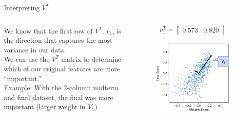 \documentclass[aspectratio=169]{../latex_main/tntbeamer}  %
\begin{document}
	
	\begin{frame}{Interpreting $V^T$}
	 \begin{columns}
	     \begin{column}{.5\textwidth}
	         We know that the first row of $V^T$, $v_1$, is the direction that captures the most variance in our data.\\
	         \bigskip
	         We can use the $V^T$ matrix to determine which of our original features are more “important.”\\
	         \bigskip
	         Example: With the 2-column midterm and final dataset, the final was more important (larger weight in $V_1$)
	     \end{column}
	     
	     
	     
	     \begin{column}{.5\textwidth}
	        \begin{equation*}
	          v_1^T = [\begin{array}{cc}
	            0.573  & 0.820
	       \end{array}] 
	       \end{equation*}
	         \begin{figure}
	             \centering
	             \includegraphics[scale=.35]{Bild15}
	         \end{figure}
	     \end{column}
	 \end{columns}
	    
	\end{frame}
	
\end{document}
